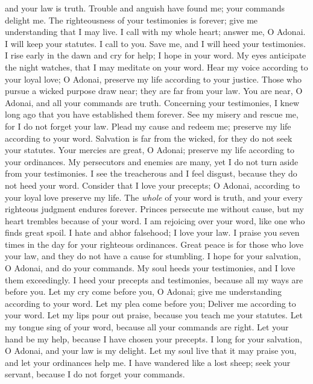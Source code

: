 \begin{biblechapter}
and your law is truth.
\verse Trouble and anguish have found me; 
your commands delight me.
\verse The righteousness of your testimonies is forever; 
give me understanding that I may live.
 I call with my whole heart; answer me, O Adonai. 
I will keep your statutes.
\verse I call to you. Save me, 
and I will heed your testimonies.
\verse I rise early in the dawn and cry for help; 
I hope in your word.
\verse My eyes anticipate the night watches, 
that I may meditate on your word.
\verse Hear my voice according to your loyal love; 
O Adonai, preserve my life according to your justice.
\verse Those who pursue a wicked purpose draw near; 
they are far from your law.
\verse You are near, O Adonai, 
and all your commands are truth.
\verse Concerning your testimonies, I knew long ago 
that you have established them forever.
 See my misery and rescue me, 
for I do not forget your law.
\verse Plead my cause and redeem me; 
preserve my life according to your word.
\verse Salvation is far from the wicked, 
for they do not seek your statutes.
\verse Your mercies are great, O Adonai; 
preserve my life according to your ordinances.
\verse My persecutors and enemies are many, 
yet I do not turn aside from your testimonies.
\verse I see the treacherous and I feel disgust, 
because they do not heed your word.
\verse Consider that I love your precepts; 
O Adonai, according to your loyal love preserve my life.
\verse The \textit{whole} of your word is truth, 
and your every righteous judgment endures forever.
 Princes persecute me without cause, 
but my heart trembles because of your word.
\verse I am rejoicing over your word, 
like one who finds great spoil.
\verse I hate and abhor falsehood; 
I love your law.
\verse I praise you seven times in the day 
for your righteous ordinances.
\verse Great peace is for those who love your law, 
and they do not have a cause for stumbling.
\verse I hope for your salvation, O Adonai, 
and do your commands.
\verse My soul heeds your testimonies, 
and I love them exceedingly.
\verse I heed your precepts and testimonies, 
because all my ways are before you.
 Let my cry come before you, O Adonai; 
give me understanding according to your word.
\verse Let my plea come before you; 
Deliver me according to your word.
\verse Let my lips pour out praise, 
because you teach me your statutes.
\verse Let my tongue sing of your word, 
because all your commands are right.
\verse Let your hand be my help, 
because I have chosen your precepts.
\verse I long for your salvation, O Adonai, 
and your law is my delight.
\verse Let my soul live that it may praise you, 
and let your ordinances help me.
\verse I have wandered like a lost sheep; seek your servant, 
because I do not forget your commands.
\end{biblechapter}

